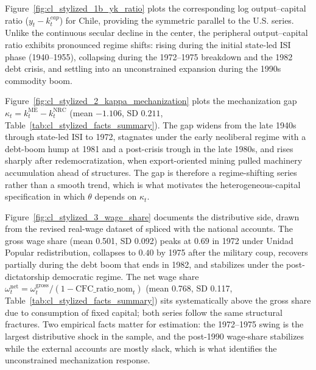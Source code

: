 Figure~\ref{fig:cl_stylized_1b_yk_ratio} plots the corresponding log output--capital ratio ($y_t - k_t^{cap}$) for Chile, providing the symmetric parallel to the U.S. series. Unlike the continuous secular decline in the center, the peripheral output--capital ratio exhibits pronounced regime shifts: rising during the initial state-led ISI phase (1940--1955), collapsing during the 1972--1975 breakdown and the 1982 debt crisis, and settling into an unconstrained expansion during the 1990s commodity boom.

Figure~\ref{fig:cl_stylized_2_kappa_mechanization} plots the mechanization
gap $\kappa_t = k_t^{\text{ME}} - k_t^{\text{NRC}}$ (mean $-1.106$, SD
$0.211$, Table~\ref{tab:cl_stylized_facts_summary}). The gap widens from the
late 1940s through state-led ISI to 1972, stagnates under the early
neoliberal regime with a debt-boom hump at 1981 and a post-crisis trough in
the late 1980s, and rises sharply after redemocratization, when
export-oriented mining pulled machinery accumulation ahead of structures.
The gap is therefore a regime-shifting series rather than a smooth trend,
which is what motivates the heterogeneous-capital specification in which
$\theta$ depends on $\kappa_t$.

Figure~\ref{fig:cl_stylized_3_wage_share} documents the distributive side,
drawn from the revised real-wage dataset of \citet{Astorga2017, Astorga2023}
spliced with the national accounts. The gross wage share (mean 0.501, SD
0.092) peaks at $0.69$ in 1972 under Unidad Popular redistribution,
collapses to $0.40$ by 1975 after the military coup, recovers partially during the
debt boom that ends in 1982, and stabilizes under the post-dictatorship democratic
regime. The net wage share $\omega_t^{\text{net}} = \omega_t^{\text{gross}} / (1 - \text{CFC\_ratio\_nom}_t)$ (mean 0.768, SD 0.117, Table~\ref{tab:cl_stylized_facts_summary}) sits systematically above the gross share due to consumption of fixed capital; both series follow the same structural fractures. Two empirical facts matter for estimation: the 1972--1975 swing is the largest distributive shock in the sample, and the post-1990 wage-share stabilizes while the external accounts are mostly slack, which is what identifies the unconstrained mechanization response.

